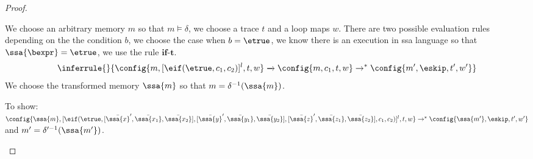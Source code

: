 \begin{proof}
\begin{itemize}
We choose an arbitrary memory $m$ so that $m \vDash \delta$, we choose a trace $t$ and a loop maps $w$.
There are two possible evaluation rules depending on the the condition $b$, we choose the case when $b = \etrue$, we know there is an execution in ssa language so that $\ssa{\bexpr} = \etrue$, we use the rule $\textbf{if-t}$.  
 \[\inferrule
{
}
{
\config{m, [\eif(\etrue, c_1, c_2)]^{l},t,w} 
\xrightarrow{} \config{m, c_1,  t,w} \to^{*} \config{m', \eskip, t', w'}
}
\]
 We choose the transformed memory ${\ssa{m}} $ so that  $ m =\delta^{-1}(\ssa{m})$.
 
 To show: $\config{\ssa{m}, [\eif(\etrue, [\bar{\ssa{x}}', \bar{\ssa{x_1}}, \bar{\ssa{x_2}}] ,[\bar{\ssa{y}}', \bar{\ssa{y_1}}, \bar{\ssa{y_2}}] ,[\bar{\ssa{z}}', \bar{\ssa{z_1}}, \bar{\ssa{z_2}}] , c_1, c_2)]^{l}, t, w} \to^{*} \config{\ssa{m'}, \eskip, t', w'} $ and $ m' = \delta'^{-1}(\ssa{m'}) $.


\end{itemize}
\end{proof}
